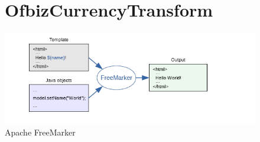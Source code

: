 
\begin{figure}[p]
\section{OfbizCurrencyTransform}
\centering
\includegraphics{functional_role/Images/freemarker.png}
\caption{Apache FreeMarker}\label{fig:1}
\end{figure}
